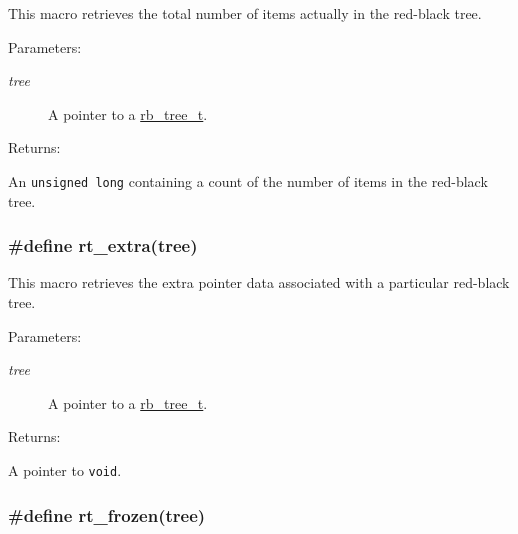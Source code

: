This macro retrieves the total number of items actually in the red-black tree.\begin{Desc}
\item[Parameters: ]\par
\begin{description}
\item[{\em 
tree}]A pointer to a \hyperlink{group__dbprim__rbtree_a0}{rb\_\-tree\_\-t}.\end{description}
\end{Desc}
\begin{Desc}
\item[Returns: ]\par
An {\tt unsigned long} containing a count of the number of items in the red-black tree. \end{Desc}
\hypertarget{group__dbprim__rbtree_a20}{
\subsubsection[rt\_\-extra]{\setlength{\rightskip}{0pt plus 5cm}\#define rt\_\-extra(tree)}}
\label{group__dbprim__rbtree_a20}


This macro retrieves the extra pointer data associated with a particular red-black tree.\begin{Desc}
\item[Parameters: ]\par
\begin{description}
\item[{\em 
tree}]A pointer to a \hyperlink{group__dbprim__rbtree_a0}{rb\_\-tree\_\-t}.\end{description}
\end{Desc}
\begin{Desc}
\item[Returns: ]\par
A pointer to {\tt void}. \end{Desc}
\hypertarget{group__dbprim__rbtree_a16}{
\subsubsection[rt\_\-frozen]{\setlength{\rightskip}{0pt plus 5cm}\#define rt\_\-frozen(tree)}}
\label{group__dbprim__rbtree_a16}


